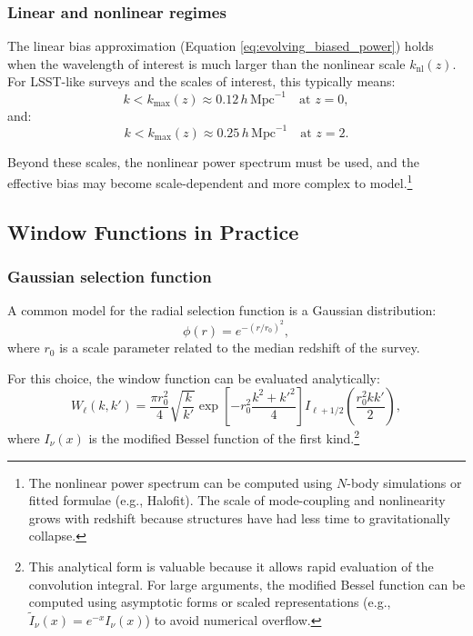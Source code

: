\subsubsection{Linear and nonlinear regimes}

The linear bias approximation (Equation \ref{eq:evolving_biased_power}) holds when the wavelength of interest is
much larger than the nonlinear scale $k_{\text{nl}}(z)$. For LSST-like surveys and the scales of interest, this
typically means:
\begin{equation}
k < k_{\text{max}}(z) \approx 0.12\,h\,\text{Mpc}^{-1} \quad \text{at } z=0,
\end{equation}
and:
\begin{equation}
k < k_{\text{max}}(z) \approx 0.25\,h\,\text{Mpc}^{-1} \quad \text{at } z=2.
\end{equation}

Beyond these scales, the nonlinear power spectrum must be used, and the effective bias may become scale-dependent
and more complex to model.\footnote{The nonlinear power spectrum can be computed using $N$-body simulations or
fitted formulae (e.g., Halofit). The scale of mode-coupling and nonlinearity grows with redshift because structures
have had less time to gravitationally collapse.}

\subsection{Window Functions in Practice}

\subsubsection{Gaussian selection function}

A common model for the radial selection function is a Gaussian distribution:
\begin{equation}
\phi(r) = e^{-(r/r_0)^2},
\label{eq:gaussian_selection}
\end{equation}
where $r_0$ is a scale parameter related to the median redshift of the survey.

For this choice, the window function can be evaluated analytically:
\begin{equation}
W_\ell(k,k') = \frac{\pi r_0^2}{4}\sqrt{\frac{k}{k'}}
\exp\left[-r_0^2\frac{k^2+k'^2}{4}\right]
I_{\ell+1/2}\left(\frac{r_0^2 k k'}{2}\right),
\label{eq:window_gaussian}
\end{equation}
where $I_\nu(x)$ is the modified Bessel function of the first kind.\footnote{This analytical form is valuable because
it allows rapid evaluation of the convolution integral. For large arguments, the modified Bessel function can be
computed using asymptotic forms or scaled representations (e.g., $\tilde{I}_\nu(x)=e^{-x}I_\nu(x)$) to avoid numerical
overflow.}


